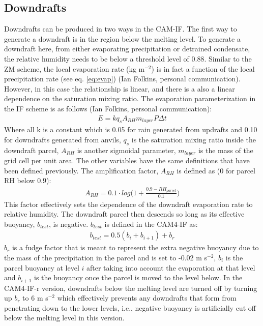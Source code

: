 \documentclass[letterpaper,12pt,titlepage,oneside,final]{book}
\begin{document}
\subsection{Downdrafts}\label{ifdown}
Downdrafts can be produced in two ways in the CAM-IF. The first way to generate a downdraft is in the region below the melting level. To generate a downdraft here, from either evaporating precipitation or detrained condensate, the relative humidity needs to be below a threshold level of 0.88. Similar to the ZM scheme, the local evaporation rate (kg m$^{-2}$) is in fact a function of the local precipitation rate (see eq. \ref{eq:evap}) (Ian Folkins, personal communication). However, in this case the relationship is linear, and there is a also a linear dependence on the saturation mixing ratio. The evaporation parameterization in the IF scheme is as follows (Ian Folkins, personal communication):
\begin{align}
E=kq_{s}A_{RH}m_{layer}P\Delta{t}
\end{align}
Where all k is a constant which is 0.05 for rain generated from updrafts and 0.10 for downdrafts generated from anvils, $q_{s}$ is the saturation mixing ratio inside the downdraft parcel, $A_{RH}$ is another sigmoidal parameter, $m_{layer}$ is the mass of the grid cell per unit area. The other variables have the same definitions that have been defined previously. The amplification factor, $A_{RH}$ is defined as (0 for parcel RH below 0.9):
\begin{align}
A_{RH}=0.1\cdot{log}\bigg(1+\frac{0.9-RH_{parcel}}{0.1}\bigg)
\end{align} 
This factor effectively sets the dependence of the downdraft evaporation rate to relative humidity. The downdraft parcel then descends so long as its effective buoyancy, $b_{test}$, is negative. $b_{test}$ is defined in the CAM4-IF as:
\begin{align}
b_{test}=0.5(b_{i}+b_{i+1})+b_{r}
\end{align}
$b_{r}$ is a fudge factor that is meant to represent the extra negative buoyancy due to the mass of the precipitation in the parcel and is set to -0.02 m s$^{-2}$, $b_{i}$ is the parcel buoyancy at level $i$ after taking into account the evaporation at that level and $b_{i+1}$ is the buoyancy once the parcel is moved to the level below. In the CAM4-IF-r version, downdrafts below the melting level are turned off by turning up $b_{r}$ to 6 m s$^{-2}$ which effectively prevents any downdrafts that form from penetrating down to the lower levels, i.e., negative buoyancy is artificially cut off below the melting level in this version. 
\end{document}
